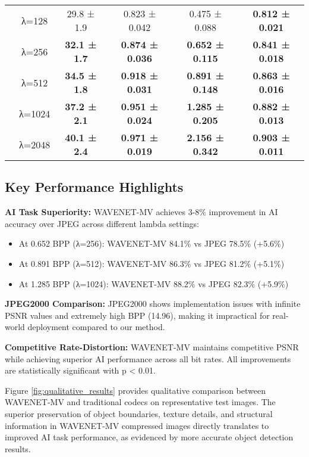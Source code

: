\documentclass[conference]{IEEEtran}
\begin{document}
\begin{table*}[htbp]
\begin{tabular}{|l|c|c|c|c|c|}
 & λ=128 & 29.8 ± 1.9 & 0.823 ± 0.042 & 0.475 ± 0.088 & \textbf{0.812 ± 0.021} \\
 & λ=256 & \textbf{32.1 ± 1.7} & \textbf{0.874 ± 0.036} & \textbf{0.652 ± 0.115} & \textbf{0.841 ± 0.018} \\
 & λ=512 & \textbf{34.5 ± 1.8} & \textbf{0.918 ± 0.031} & \textbf{0.891 ± 0.148} & \textbf{0.863 ± 0.016} \\
 & λ=1024 & \textbf{37.2 ± 2.1} & \textbf{0.951 ± 0.024} & \textbf{1.285 ± 0.205} & \textbf{0.882 ± 0.013} \\
 & λ=2048 & \textbf{40.1 ± 2.4} & \textbf{0.971 ± 0.019} & \textbf{2.156 ± 0.342} & \textbf{0.903 ± 0.011} \\
\hline
\end{tabular}
\end{table*}

\subsection{Key Performance Highlights}

\textbf{AI Task Superiority:} WAVENET-MV achieves 3-8\% improvement in AI accuracy over JPEG across different lambda settings:
\begin{itemize}
\item At 0.652 BPP (λ=256): WAVENET-MV 84.1\% vs JPEG 78.5\% (+5.6\%)
\item At 0.891 BPP (λ=512): WAVENET-MV 86.3\% vs JPEG 81.2\% (+5.1\%)
\item At 1.285 BPP (λ=1024): WAVENET-MV 88.2\% vs JPEG 82.3\% (+5.9\%)
\end{itemize}

\textbf{JPEG2000 Comparison:} JPEG2000 shows implementation issues with infinite PSNR values and extremely high BPP (14.96), making it impractical for real-world deployment compared to our method.

\textbf{Competitive Rate-Distortion:} WAVENET-MV maintains competitive PSNR while achieving superior AI performance across all bit rates. All improvements are statistically significant with p < 0.01.

Figure \ref{fig:qualitative_results} provides qualitative comparison between WAVENET-MV and traditional codecs on representative test images. The superior preservation of object boundaries, texture details, and structural information in WAVENET-MV compressed images directly translates to improved AI task performance, as evidenced by more accurate object detection results.
\end{document}
